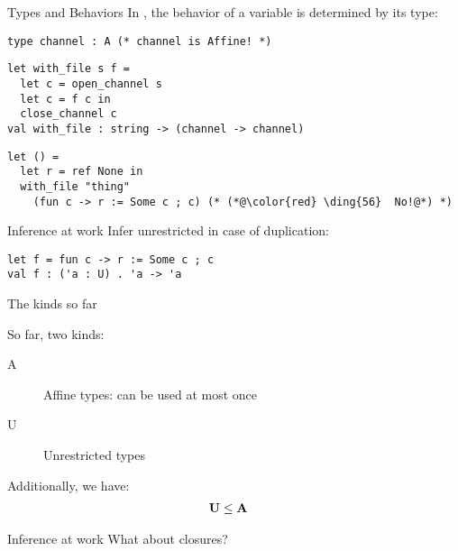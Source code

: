 \documentclass[xcolor=svgnames,11pt]{beamer}
\begin{document}
\begin{frame}[fragile]{Types and Behaviors}
  In \lang, the behavior of a variable is determined
  by its type:
\begin{lstlisting}
type channel : A (* channel is Affine! *)
\end{lstlisting}\pause
\begin{lstlisting}
let with_file s f = 
  let c = open_channel s
  let c = f c in
  close_channel c
val with_file : string -> (channel -> channel)
\end{lstlisting}\pause
\begin{lstlisting}
let () = 
  let r = ref None in
  with_file "thing"
    (fun c -> r := Some c ; c) (* (*@\color{red} \ding{56}  No!@*) *)
\end{lstlisting}
\end{frame}

\begin{frame}[fragile]{Inference at work}
  Infer unrestricted in case of duplication:
\begin{lstlisting}
let f = fun c -> r := Some c ; c
val f : ('a : U) . 'a -> 'a
\end{lstlisting}
\end{frame}

\begin{frame}{The kinds so far}

  So far, two kinds:
  \begin{description}
  \item[A] Affine types: can be used at most once
  \item[U] Unrestricted types
  \end{description}

  Additionally, we have:
  \begin{align*}
    \mathbf{U} &\leq \mathbf{A}
  \end{align*}
\end{frame}


\begin{frame}[fragile]{Inference at work}
  What about closures?
\end{frame}
\end{document}
